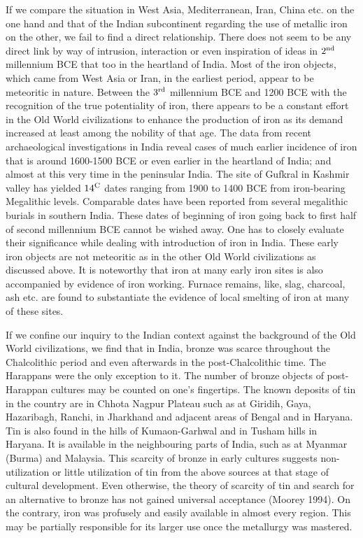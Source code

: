 If we compare the situation in West Asia, Mediterranean, Iran, China etc. on the one hand and that of the Indian subcontinent regarding the use of metallic iron on the other, we fail to find a direct relationship. There does not seem to be any direct link by way of intrusion, interaction or even inspiration of ideas in $2^{\rm nd}$ millennium BCE that too in the heartland of India. Most of the iron objects, which came from West Asia or Iran, in the earliest period, appear to be meteoritic in nature. Between the $3^{\rm rd}$ millennium BCE and 1200 BCE with the recognition of the true potentiality of iron, there appears to be a constant effort in the Old World civilizations to enhance the production of iron as its demand increased at least among the nobility of that age. The data from recent archaeological investigations in India reveal cases of much earlier incidence of iron that is around 1600-1500 BCE or even earlier in the heartland of India; and almost at this very time in the peninsular India. The site of Gufkral in Kashmir valley has yielded ${14}^{\rm C}$ dates ranging from 1900 to 1400 BCE from iron-bearing Megalithic levels. Comparable dates have been reported from several megalithic burials in southern India. These dates of beginning of iron going back to first half of second millennium BCE cannot be wished away. One has to closely evaluate their significance while dealing with introduction of iron in India. These early iron objects are not meteoritic as in the other Old World civilizations as discussed above. It is noteworthy that iron at many early iron sites is also accompanied by evidence of iron working. Furnace remains, like, slag, charcoal, ash etc. are found to substantiate the evidence of local smelting of iron at many of these sites. 

If we confine our inquiry to the Indian context against the background of the Old World civilizations, we find that in India, bronze was scarce throughout the Chalcolithic period and even afterwards in the post-Chalcolithic time. The Harappans were the only exception to it. The number of bronze objects of post-Harappan cultures may be counted on one’s fingertips. The known deposits of tin in the country are in Chhota Nagpur Plateau such as at Giridih, Gaya, Hazaribagh, Ranchi, in Jharkhand and adjacent areas of Bengal and in Haryana. Tin is also found in the hills of Kumaon-Garhwal and in Tusham hills in Haryana. It is available in the neighbouring parts of India, such as at Myanmar (Burma) and Malaysia. This scarcity of bronze in early cultures suggests non-utilization or little utilization of tin from the above sources at that stage of cultural development. Even otherwise, the theory of scarcity of tin and search for an alternative to bronze has not gained universal acceptance (Moorey 1994). On the contrary, iron was profusely and easily available in almost every region. This may be partially responsible for its larger use once the metallurgy was mastered.

